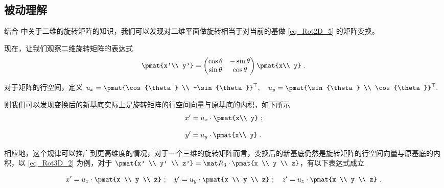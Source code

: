 \subsection{被动理解}

结合  中关于二维的旋转矩阵的知识，我们可以发现对二维平面做旋转相当于对当前的基做 \autoref{eq_Rot2D_5} 的矩阵变换。

现在，让我们观察二维旋转矩阵的表达式
\begin{equation}
\pmat{x'\\ y'} =
\begin{pmatrix}
\cos\theta & - \sin\theta\\
\sin\theta &\cos\theta
\end{pmatrix}\pmat{x\\ y}~.
\end{equation}

对于矩阵的行空间，定义 $u_{x}=\pmat{\cos{\theta} \\ -\sin{\theta}}^{\top} ,\quad u_{y}=\pmat{\sin{\theta} \\ \cos{\theta}}^{\top}.$

则我们可以发现变换后的新基底实际上是旋转矩阵的行空间向量与原基底的内积，如下所示
\begin{equation}
x' = u_{x} \cdot \pmat{x\\ y} ~;
\end{equation}

\begin{equation}
y' = u_{y} \cdot \pmat{x\\ y} ~.
\end{equation}

相应地，这个规律可以推广到更高维度的情况，对于一个三维的旋转矩阵而言，变换后的新基底仍然是旋转矩阵的行空间向量与原基底的内积，以 \autoref{eq_Rot3D_2} 为例，对于 $\pmat{x' \\ y' \\ z'} = \mat R_3 \cdot \pmat{x \\ y \\ z}$，有以下表达式成立

\begin{equation}
x' = u_{x} \cdot \pmat{x \\ y \\ z} ~; \quad
y' = u_{y} \cdot \pmat{x \\ y \\ z} ~; \quad
z' = u_{z} \cdot \pmat{x \\ y \\ z} ~.
\end{equation}

